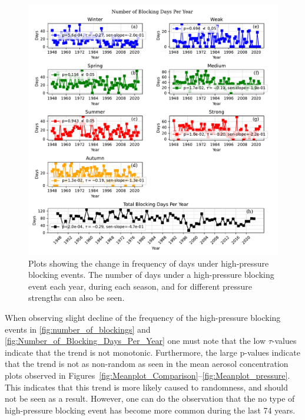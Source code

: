 \begin{figure}[H]
    \centering
    \includegraphics[width=\textwidth]{Figures/blocking_days_per_year_all.pdf}
    \caption{Plots showing the change in frequency of days under high-pressure blocking events. The number of days under a high-pressure blocking event each year, during each season, and for different pressure strengths can also be seen.}
    \label{fig:Number_of_Blocking_Days_Per_Year}
\end{figure}

When observing slight decline of the frequency of the high-pressure blocking events in \autoref{fig:number_of_blockings} and \autoref{fig:Number_of_Blocking_Days_Per_Year} one must note that the low $\tau$-values indicate that the trend is not monotonic. Furthermore, the large p-values indicate that the trend is not as non-random as seen in the mean aerosol concentration plots observed in Figures~\ref{fig:Meanplot_Comparison}--\ref{fig:Meanplot_pressure}. This indicates that this trend is more likely caused to randomness, and should not be seen as a result. However, one can do the observation that the no type of high-pressure blocking event has become more common during the last 74 years. 
